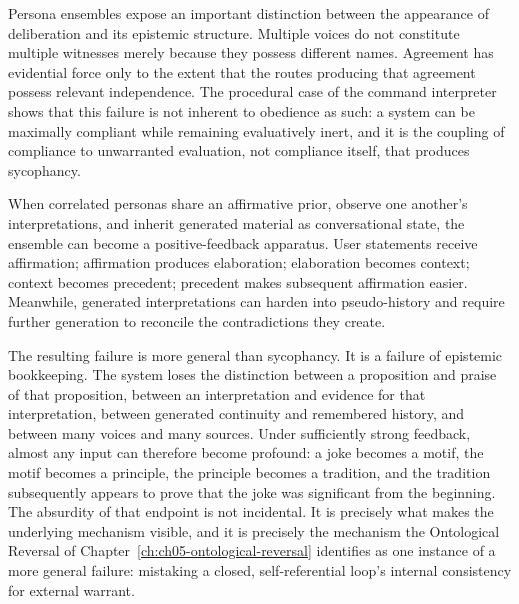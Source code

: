 Persona ensembles expose an important distinction between the appearance of deliberation and its epistemic structure. Multiple voices do not constitute multiple witnesses merely because they possess different names. Agreement has evidential force only to the extent that the routes producing that agreement possess relevant independence. The procedural case of the command interpreter shows that this failure is not inherent to obedience as such: a system can be maximally compliant while remaining evaluatively inert, and it is the coupling of compliance to unwarranted evaluation, not compliance itself, that produces sycophancy.

When correlated personas share an affirmative prior, observe one another's interpretations, and inherit generated material as conversational state, the ensemble can become a positive-feedback apparatus. User statements receive affirmation; affirmation produces elaboration; elaboration becomes context; context becomes precedent; precedent makes subsequent affirmation easier. Meanwhile, generated interpretations can harden into pseudo-history and require further generation to reconcile the contradictions they create.

The resulting failure is more general than sycophancy. It is a failure of epistemic bookkeeping. The system loses the distinction between a proposition and praise of that proposition, between an interpretation and evidence for that interpretation, between generated continuity and remembered history, and between many voices and many sources. Under sufficiently strong feedback, almost any input can therefore become profound: a joke becomes a motif, the motif becomes a principle, the principle becomes a tradition, and the tradition subsequently appears to prove that the joke was significant from the beginning. The absurdity of that endpoint is not incidental. It is precisely what makes the underlying mechanism visible, and it is precisely the mechanism the Ontological Reversal of Chapter~\ref{ch:ch05-ontological-reversal} identifies as one instance of a more general failure: mistaking a closed, self-referential loop's internal consistency for external warrant.
